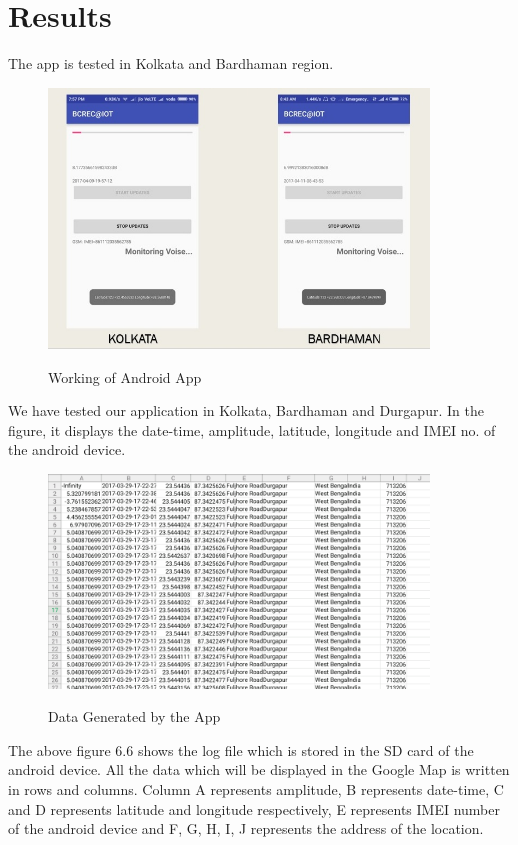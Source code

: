 \section{Results}
The app is tested in Kolkata and Bardhaman region.


\begin{figure}[!htbp]
	\centering
	\includegraphics[width=0.9\textwidth]{6.jpg}
	\label{fig:Working of Android App}
	\caption{Working of Android App}
\end{figure}


\vspace{0.2in}
We have tested our application in Kolkata, Bardhaman and    Durgapur. In the figure, it displays the date-time, amplitude, latitude, longitude and IMEI no. of the android device.

\begin{figure}[!htbp]
	\centering
	\includegraphics[width=0.9\textwidth]{7.png}
	\label{fig:Data Generated by the App}
	\caption{Data Generated by the App}
\end{figure}

The above figure 6.6 shows the log file which is stored in the SD card of the android device. All the data which will be displayed in the Google Map is written in rows and columns. Column A represents amplitude, B represents date-time, C and D represents latitude and longitude respectively, E represents IMEI number of the android device and F, G, H, I, J represents the address of the location. 

